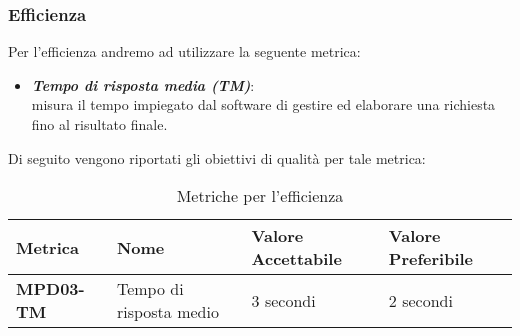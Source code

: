 \subsubsection{Efficienza}
Per l'efficienza andremo ad utilizzare la seguente metrica:
\begin{itemize}
    \item \textbf{\emph{Tempo di risposta media (TM)}}:\\
    misura il tempo impiegato dal software di gestire ed elaborare una richiesta fino al risultato finale.
\end{itemize}
Di seguito vengono riportati gli obiettivi di qualità per tale metrica:
\begin{table}[htbp]
    \centering
    \begin{tabular}{|>{\centering\arraybackslash}p{4cm}|p{4cm}|p{4cm}|p{4cm}|}
    \hline
    \rowcolor{gray!30}
    \textbf{Metrica} & \textbf{Nome} & \textbf{Valore Accettabile} & \textbf{Valore Preferibile} \\
    \hline
    \rowcolor{gray!10}
    \textbf{MPD03-TM} & Tempo di risposta medio & 3 secondi & 2 secondi \\
    \hline
    \end{tabular}
    \caption{Metriche per l'efficienza}
    \label{tab:metriche_efficienza}
\end{table}


